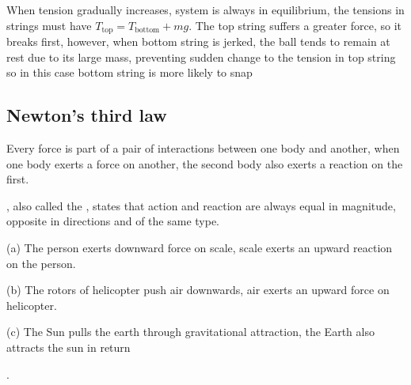	
\begin{soln}
When tension gradually increases, system is always in equilibrium, the tensions in strings must have $T_\text{top} = T_\text{bottom} + mg$. The top string suffers a greater force, so it breaks first, however, when bottom string is jerked, the ball tends to remain at rest due to its large mass, preventing sudden change to the tension in top string so in this case bottom string is more likely to snap 
\end{soln}


\subsection{Newton's third law}

Every force is part of a pair of interactions between one body and another, when one body exerts a force on another, the second body also exerts a reaction on the first.

\begin{ilight}
	, also called the , states that action and reaction are always equal in magnitude, opposite in directions and of the same type.
\end{ilight}


\begin{soln}(a) The person exerts downward force on scale, scale exerts an upward reaction on the person.

(b) The rotors of helicopter push air downwards, air exerts an upward force on helicopter.

(c) The Sun pulls the earth through gravitational attraction, the Earth also attracts the sun in return \end{soln}.


